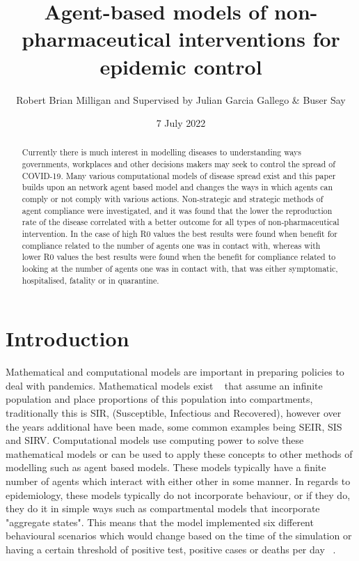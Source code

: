 \documentclass{article}
\title{Agent-based models of non-pharmaceutical interventions for epidemic control}
\author{Robert Brian Milligan and Supervised by Julian Garcia Gallego \& Buser Say}
\date{7 July 2022}
\begin{document}
\maketitle

\begin{abstract}
Currently there is much interest in modelling diseases to understanding ways governments, workplaces and other decisions makers may seek to control the spread of COVID-19. Many various computational models of disease spread exist and this paper builds upon an network agent based model and changes the ways in which agents can comply or not comply with various actions. Non-strategic and strategic methods of agent compliance were investigated, and it was found that the lower the reproduction rate of the disease correlated with a better outcome for all types of non-pharmaceutical intervention. In the case of high R0 values the best results were found when benefit for compliance related to the number of agents one was in contact with, whereas with lower R0 values the best results were found when the benefit for compliance related to looking at the number of agents one was in contact with, that was either symptomatic, hospitalised, fatality or in quarantine.
\end{abstract}



\tableofcontents

\newpage 

\section{Introduction}

Mathematical and computational models are important in preparing policies to deal with pandemics. Mathematical models exist ~\cite{cooper_mondal_antonopoulos_2020} that assume an infinite population and place proportions of this population into compartments, traditionally this is SIR, (Susceptible, Infectious and Recovered), however over the years additional have been made, some common examples being SEIR, SIS and SIRV. Computational models use computing power to solve these mathematical models or can be used to apply these concepts to other methods of modelling such as agent based models. These models typically have a finite number of agents which interact with either other in some manner. In regards to epidemiology, these models typically do not incorporate behaviour, or if they do, they do it in simple ways such as compartmental models that incorporate "aggregate states". This means that the model implemented six different behavioural scenarios which would change based on the time of the simulation or having a certain threshold of positive test, positive cases or deaths per day ~\cite{karaivanov_2020}.\linebreak
\end{document}
